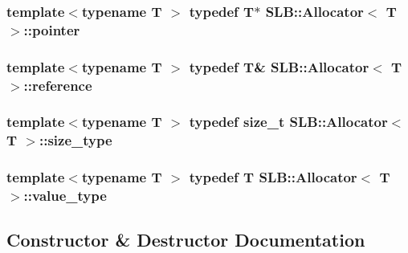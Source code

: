 \subsubsection[{\texorpdfstring{pointer}{pointer}}]{\setlength{\rightskip}{0pt plus 5cm}template$<$typename T $>$ typedef T$\ast$ {\bf S\+L\+B\+::\+Allocator}$<$ T $>$\+::{\bf pointer}}\hypertarget{classSLB_1_1Allocator_aae4ca3972f504938f16542e0eeb295ac}{}\label{classSLB_1_1Allocator_aae4ca3972f504938f16542e0eeb295ac}
\subsubsection[{\texorpdfstring{reference}{reference}}]{\setlength{\rightskip}{0pt plus 5cm}template$<$typename T $>$ typedef T\& {\bf S\+L\+B\+::\+Allocator}$<$ T $>$\+::{\bf reference}}\hypertarget{classSLB_1_1Allocator_acf01b8e7caf65e4204d91462b61d65f3}{}\label{classSLB_1_1Allocator_acf01b8e7caf65e4204d91462b61d65f3}
\subsubsection[{\texorpdfstring{size\+\_\+type}{size_type}}]{\setlength{\rightskip}{0pt plus 5cm}template$<$typename T $>$ typedef size\+\_\+t {\bf S\+L\+B\+::\+Allocator}$<$ T $>$\+::{\bf size\+\_\+type}}\hypertarget{classSLB_1_1Allocator_ab5b27ae3bc010c6a60b3ec7f9bdbd06f}{}\label{classSLB_1_1Allocator_ab5b27ae3bc010c6a60b3ec7f9bdbd06f}
\subsubsection[{\texorpdfstring{value\+\_\+type}{value_type}}]{\setlength{\rightskip}{0pt plus 5cm}template$<$typename T $>$ typedef T {\bf S\+L\+B\+::\+Allocator}$<$ T $>$\+::{\bf value\+\_\+type}}\hypertarget{classSLB_1_1Allocator_aa7059448157f4fb75e7609ddc0ec1f1b}{}\label{classSLB_1_1Allocator_aa7059448157f4fb75e7609ddc0ec1f1b}


\subsection{Constructor \& Destructor Documentation}
